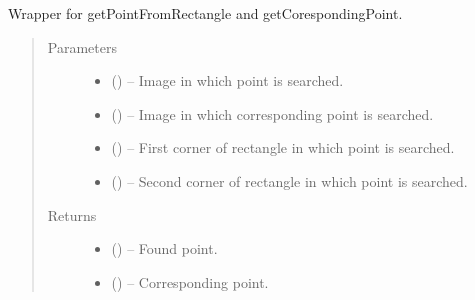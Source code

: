 \documentclass[letterpaper,10pt,english]{sphinxmanual}
\begin{document}
\begin{fulllineitems}
\label{\detokenize{image_sac:image_sac.getPFromRectangleACorespondingP}}
Wrapper for getPointFromRectangle and getCorespondingPoint.
\begin{quote}\begin{description}
\item[{Parameters}] \leavevmode\begin{itemize}
\item {} 
 () -- Image in which point is searched.

\item {} 
 () -- Image in which corresponding point is searched.

\item {} 
 () -- First corner of rectangle in which point is searched.

\item {} 
 () -- Second corner of rectangle in which point is searched.

\end{itemize}

\item[{Returns}] \leavevmode
\begin{itemize}
\item {} 
 () -- Found point.

\item {} 
 () -- Corresponding point.

\end{itemize}


\end{description}\end{quote}

\end{fulllineitems}

\end{document}
